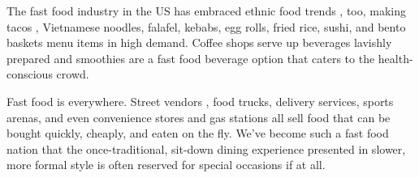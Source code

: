\documentclass{book}\usepackage[]{graphicx}\usepackage[]{color}
\begin{document}
The fast food industry in the US has embraced ethnic food trends , too, making tacos  , Vietnamese noodles, falafel, kebabs, egg rolls, fried rice, sushi, and bento baskets menu items in high demand. Coffee shops serve up beverages lavishly prepared and smoothies are a fast food beverage option that caters to the health-conscious crowd.

Fast food is everywhere. Street vendors , food trucks, delivery services, sports arenas, and even convenience stores and gas stations all sell food that can be bought quickly, cheaply, and eaten on the fly. We've become such a fast food nation that the once-traditional, sit-down dining experience presented in slower, more formal style is often reserved for special occasions if at all.

\printindex
\end{document}
